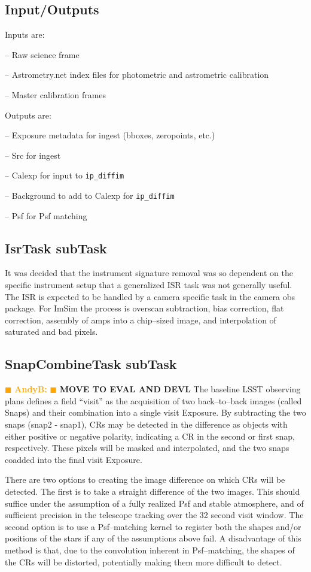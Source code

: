 \documentclass[12pt]{article}
\newcommand{\becker} { \textcolor{orange} {
\ensuremath{\blacksquare} {\bf AndyB:}  
\ensuremath{\blacksquare} } }
\begin{document}
\subsection{Input/Outputs}
Inputs are:

-- Raw science frame

-- Astrometry.net index files for photometric and astrometric calibration

-- Master calibration frames



Outputs are:

-- Exposure metadata for ingest (bboxes, zeropoints, etc.)

-- Src for ingest

-- Calexp for input to {\tt ip\_diffim}

-- Background to add to Calexp for {\tt ip\_diffim}

-- Psf for Psf matching

\subsection{IsrTask subTask}
It was decided that the instrument signature removal was so dependent on the specific instrument setup that a generalized
ISR task was not generally useful.  The ISR is expected to be handled by a camera specific task in the camera obs package.  
For ImSim the process is overscan subtraction, bias correction, flat correction, assembly of amps into a chip--sized image, 
and interpolation of saturated and bad pixels.

\subsection{SnapCombineTask subTask} \becker
{\bf MOVE TO EVAL AND DEVL}
The baseline LSST observing plans defines a field ``visit'' as the
acquisition of two back--to--back images (called Snaps) and their
combination into a single visit Exposure.  By subtracting the two snaps
(snap2 - snap1), CRs may be detected in the difference as objects with
either positive or negative polarity, indicating a CR in the second or
first snap, respectively.  These pixels will be masked and
interpolated, and the two snaps coadded into the final visit Exposure.


There are two options to creating the image difference on which CRs
will be detected.  The first is to take a straight difference of the
two images.  This should suffice under the assumption of a fully
realized Psf and stable atmosphere, and of sufficient precision in the
telescope tracking over the 32 second visit window.  The second option
is to use a Psf--matching kernel to register both the shapes and/or
positions of the stars if any of the assumptions above fail.  A
disadvantage of this method is that, due to the convolution inherent
in Psf--matching, the shapes of the CRs will be distorted, potentially
making them more difficult to detect.
\end{document}
